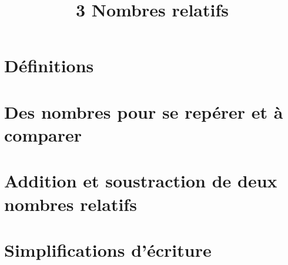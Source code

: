 \documentclass[12pt,a4paper]{article}
\date{}
\title{\textcircled{{\normalsize{3}}} Nombres relatifs}
\begin{document}
	
	\maketitle



\section{Définitions}



\newpage
\section{Des nombres pour se repérer et à comparer}


 \newpage
 
\section{Addition et soustraction de deux nombres relatifs}



\newpage

\section{Simplifications d'écriture}


\end{document}
